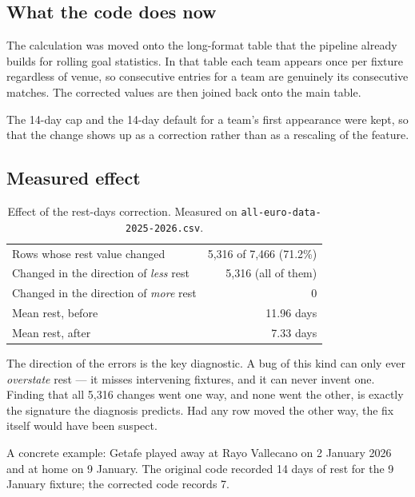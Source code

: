 \documentclass[11pt,a4paper]{article}
\newcommand{\code}[1]{\texttt{#1}}
\begin{document}
\subsection{What the code does now}

The calculation was moved onto the long-format table that the pipeline
already builds for rolling goal statistics. In that table each team appears
once per fixture regardless of venue, so consecutive entries for a team are
genuinely its consecutive matches. The corrected values are then joined back
onto the main table.

The 14-day cap and the 14-day default for a team's first appearance were kept,
so that the change shows up as a correction rather than as a rescaling of the
feature.

\subsection{Measured effect}

\begin{table}[h]
\centering
\small
\begin{tabular}{@{}lr@{}}
\toprule
Rows whose rest value changed        & 5{,}316 of 7{,}466 (71.2\%) \\
Changed in the direction of \emph{less} rest & 5{,}316 (all of them) \\
Changed in the direction of \emph{more} rest & 0 \\
Mean rest, before                    & 11.96 days \\
Mean rest, after                     & 7.33 days \\
\bottomrule
\end{tabular}
\caption{Effect of the rest-days correction. Measured on
\code{all-euro-data-2025-2026.csv}.}
\end{table}

The direction of the errors is the key diagnostic. A bug of this kind can
only ever \emph{overstate} rest --- it misses intervening fixtures, and it can
never invent one. Finding that all 5{,}316 changes went one way, and none went
the other, is exactly the signature the diagnosis predicts. Had any row moved
the other way, the fix itself would have been suspect.

A concrete example: Getafe played away at Rayo Vallecano on 2 January 2026 and
at home on 9 January. The original code recorded 14 days of rest for the 9
January fixture; the corrected code records 7.

\end{document}
